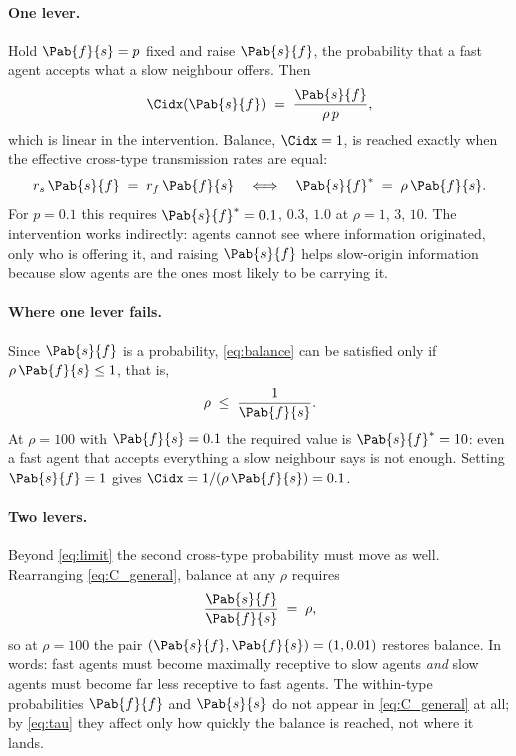 \paragraph{One lever.} Hold $\Pab{f}{s} = p$ fixed and raise $\Pab{s}{f}$, the probability that a fast agent accepts what a slow neighbour offers. Then
\begin{equation}
\Cidx(\Pab{s}{f}) \;=\; \frac{\Pab{s}{f}}{\rho\, p},
\label{eq:C_intervention}
\end{equation}
which is linear in the intervention. Balance, $\Cidx = 1$, is reached exactly when the effective cross-type transmission rates are equal:
\begin{equation}
r_s\, \Pab{s}{f} \;=\; r_f\, \Pab{f}{s}
\quad\Longleftrightarrow\quad
\Pab{s}{f}^{\ast} \;=\; \rho\, \Pab{f}{s}.
\label{eq:balance}
\end{equation}
For $p = 0.1$ this requires $\Pab{s}{f}^\ast = 0.1$, $0.3$, $1.0$ at $\rho = 1$, $3$, $10$. The intervention works indirectly: agents cannot see where information originated, only who is offering it, and raising $\Pab{s}{f}$ helps slow-origin information because slow agents are the ones most likely to be carrying it.

\paragraph{Where one lever fails.} Since $\Pab{s}{f}$ is a probability, \eqref{eq:balance} can be satisfied only if $\rho\, \Pab{f}{s} \leq 1$, that is,
\begin{equation}
\rho \;\leq\; \frac{1}{\Pab{f}{s}}.
\label{eq:limit}
\end{equation}
At $\rho = 100$ with $\Pab{f}{s} = 0.1$ the required value is $\Pab{s}{f}^\ast = 10$: even a fast agent that accepts everything a slow neighbour says is not enough. Setting $\Pab{s}{f} = 1$ gives $\Cidx = 1/(\rho\, \Pab{f}{s}) = 0.1$.

\paragraph{Two levers.} Beyond \eqref{eq:limit} the second cross-type probability must move as well. Rearranging \eqref{eq:C_general}, balance at any $\rho$ requires
\begin{equation}
\frac{\Pab{s}{f}}{\Pab{f}{s}} \;=\; \rho,
\label{eq:two_levers}
\end{equation}
so at $\rho = 100$ the pair $(\Pab{s}{f}, \Pab{f}{s}) = (1, 0.01)$ restores balance. In words: fast agents must become maximally receptive to slow agents \emph{and} slow agents must become far less receptive to fast agents. The within-type probabilities $\Pab{f}{f}$ and $\Pab{s}{s}$ do not appear in \eqref{eq:C_general} at all; by \eqref{eq:tau} they affect only how quickly the balance is reached, not where it lands.

